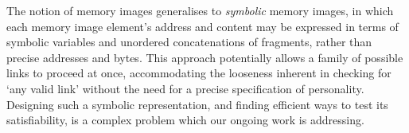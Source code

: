 \documentclass[preprint,10pt]{sigplanconf-pldi16}
\begin{document}
% 

The notion of memory images generalises to \emph{symbolic} memory images, in which 
each memory image element's address and content may be expressed in terms of 
symbolic variables and unordered concatenations of fragments, rather than precise addresses
and bytes.
This approach potentially allows a family of possible links to proceed at once,
accommodating the looseness inherent in checking for `any valid link' without the need
for a precise specification of personality.
Designing such a symbolic representation, and finding efficient ways to test its satisfiability, 
is a complex problem which our ongoing work is addressing.



% 
% 
% 

% 
% 
% 
% 
% 
% 
% 
% 
\end{document}
